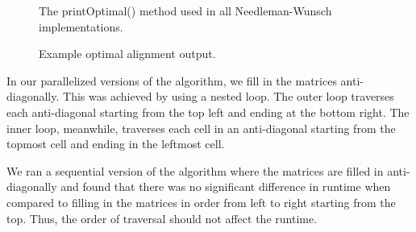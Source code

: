 \documentclass[conference]{IEEEtran}
\begin{document}
\begin{figure}[htbp]
\centerline{}
\caption{The printOptimal() method used in all Needleman-Wunsch implementations.}
\label{10}
\end{figure}

\begin{figure}[htbp]
\centerline{}
\caption{Example optimal alignment output.}
\label{11}
\end{figure}

In our parallelized versions of the algorithm, we fill in the matrices anti-diagonally. This was achieved by using a nested loop. The outer loop traverses each anti-diagonal starting from the top left and ending at the bottom right. The inner loop, meanwhile, traverses each cell in an anti-diagonal starting from the topmost cell and ending in the leftmost cell.

We ran a sequential version of the algorithm where the matrices are filled in anti-diagonally and found that there was no significant difference in runtime when compared to filling in the matrices in order from left to right starting from the top. Thus, the order of traversal should not affect the runtime.
\end{document}
